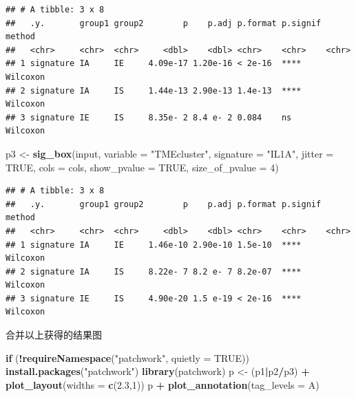 \documentclass[
  12pt,
]{book}
\newenvironment{Shaded}{\begin{snugshade}}{\end{snugshade}}
\newcommand{\AttributeTok}[1]{\textcolor[rgb]{0.13,0.29,0.53}{#1}}
\newcommand{\ConstantTok}[1]{\textcolor[rgb]{0.56,0.35,0.01}{#1}}
\newcommand{\ControlFlowTok}[1]{\textcolor[rgb]{0.13,0.29,0.53}{\textbf{#1}}}
\newcommand{\DecValTok}[1]{\textcolor[rgb]{0.00,0.00,0.81}{#1}}
\newcommand{\FloatTok}[1]{\textcolor[rgb]{0.00,0.00,0.81}{#1}}
\newcommand{\FunctionTok}[1]{\textcolor[rgb]{0.13,0.29,0.53}{\textbf{#1}}}
\newcommand{\NormalTok}[1]{#1}
\newcommand{\OtherTok}[1]{\textcolor[rgb]{0.56,0.35,0.01}{#1}}
\newcommand{\SpecialCharTok}[1]{\textcolor[rgb]{0.81,0.36,0.00}{\textbf{#1}}}
\newcommand{\StringTok}[1]{\textcolor[rgb]{0.31,0.60,0.02}{#1}}
\begin{document}
\begin{verbatim}
## # A tibble: 3 x 8
##   .y.       group1 group2        p    p.adj p.format p.signif method  
##   <chr>     <chr>  <chr>     <dbl>    <dbl> <chr>    <chr>    <chr>   
## 1 signature IA     IE     4.09e-17 1.20e-16 < 2e-16  ****     Wilcoxon
## 2 signature IA     IS     1.44e-13 2.90e-13 1.4e-13  ****     Wilcoxon
## 3 signature IE     IS     8.35e- 2 8.4 e- 2 0.084    ns       Wilcoxon
\end{verbatim}

\begin{Shaded}
\begin{Highlighting}[]
\NormalTok{p3 }\OtherTok{\textless{}{-}} \FunctionTok{sig\_box}\NormalTok{(input, }\AttributeTok{variable =} \StringTok{"TMEcluster"}\NormalTok{, }\AttributeTok{signature =} \StringTok{"IL1A"}\NormalTok{,  }
              \AttributeTok{jitter =} \ConstantTok{TRUE}\NormalTok{, }\AttributeTok{cols =}\NormalTok{  cols, }\AttributeTok{show\_pvalue =} \ConstantTok{TRUE}\NormalTok{, }\AttributeTok{size\_of\_pvalue =} \DecValTok{4}\NormalTok{)}
\end{Highlighting}
\end{Shaded}

\begin{verbatim}
## # A tibble: 3 x 8
##   .y.       group1 group2        p    p.adj p.format p.signif method  
##   <chr>     <chr>  <chr>     <dbl>    <dbl> <chr>    <chr>    <chr>   
## 1 signature IA     IE     1.46e-10 2.90e-10 1.5e-10  ****     Wilcoxon
## 2 signature IA     IS     8.22e- 7 8.2 e- 7 8.2e-07  ****     Wilcoxon
## 3 signature IE     IS     4.90e-20 1.5 e-19 < 2e-16  ****     Wilcoxon
\end{verbatim}

合并以上获得的结果图

\begin{Shaded}
\begin{Highlighting}[]
\ControlFlowTok{if}\NormalTok{ (}\SpecialCharTok{!}\FunctionTok{requireNamespace}\NormalTok{(}\StringTok{"patchwork"}\NormalTok{, }\AttributeTok{quietly =} \ConstantTok{TRUE}\NormalTok{))   }\FunctionTok{install.packages}\NormalTok{(}\StringTok{"patchwork"}\NormalTok{)}
\FunctionTok{library}\NormalTok{(patchwork)}
\NormalTok{p }\OtherTok{\textless{}{-}}\NormalTok{ (p1}\SpecialCharTok{|}\NormalTok{p2}\SpecialCharTok{/}\NormalTok{p3) }\SpecialCharTok{+} \FunctionTok{plot\_layout}\NormalTok{(}\AttributeTok{widths =} \FunctionTok{c}\NormalTok{(}\FloatTok{2.3}\NormalTok{,}\DecValTok{1}\NormalTok{))}
\NormalTok{p }\SpecialCharTok{+} \FunctionTok{plot\_annotation}\NormalTok{(}\AttributeTok{tag\_levels =} \StringTok{\textquotesingle{}A\textquotesingle{}}\NormalTok{)}
\end{Highlighting}
\end{Shaded}
\end{document}
